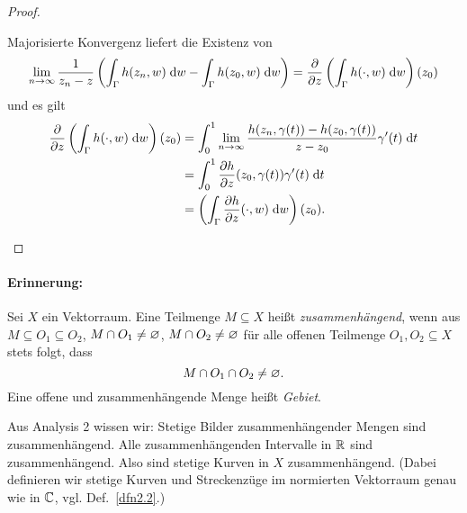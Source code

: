 \documentclass[a4paper,twoside,DIV15,BCOR12mm]{scrbook}
\begin{document}
\begin{proof}
\begin{enumerate}
Majorisierte Konvergenz liefert die Existenz von
\[\displaystyle\lim_{n\rightarrow\infty}\frac{1}{z_n-z}\left(\int_{\Gamma}^{}{h(z_n,w)}\;\mathrm{d} w-\int_{\Gamma}^{}{h(z_0,w)}\;\mathrm{d} w\right) = \frac{\partial}{\partial z}\left(\int_{\Gamma}^{}{h(\cdot,w)}\;\mathrm{d} w\right)(z_0)\]
und es gilt
\begin{align*}
\frac{\partial}{\partial z}\left(\integral{\Gamma}{}{h(\cdot,w)}{w}\right)(z_0) &=\integral{0}{1}{\limf{n}\frac{h(z_n,\gamma(t))-h(z_0,\gamma(t))}{z-z_0}\gamma^\prime(t)}{t}\\
&=\integral{0}{1}{\frac{\partial h}{\partial z}(z_0,\gamma(t))\gamma^\prime(t)}{t}\\
&=\left(\integral{\Gamma}{}{\frac{\partial h}{\partial z}(\cdot,w)}{w}\right)(z_0).\tag*{\qedhere}%
\end{align*}
\end{enumerate}\end{proof}

\paragraph{Erinnerung:} Sei $X$ ein Vektorraum. Eine Teilmenge $M\subseteq X$ heißt \emph{zusammenhängend}, wenn aus $M\subseteq
O_1\subseteq O_2$, $M\cap O_1\neq \varnothing$, $M\cap O_2\neq\varnothing$ für alle offenen Teilmenge $O_1,O_2\subseteq X$ stets folgt, dass
\[M\cap O_1 \cap O_2 \neq \varnothing.\]
Eine offene und zusammenhängende Menge heißt \emph{Gebiet}.

\begin{bem*}
  Aus Analysis 2 wissen wir: Stetige Bilder zusammenhängender Mengen sind zusammenhängend. Alle zusammenhängenden Intervalle in
  $\mathbb{R}$ sind zusammenhängend. Also sind stetige Kurven in $X$ zusammenhängend. (Dabei definieren wir stetige Kurven und
  Streckenzüge im normierten Vektorraum genau wie in $\mathbb{C}$, vgl. Def.~\ref{dfn2.2}.)
\end{bem*}
\end{document}
